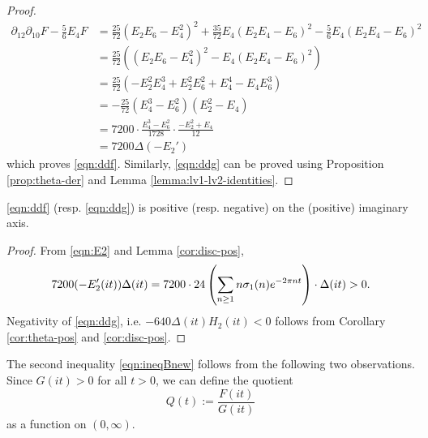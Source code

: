 \begin{proof}
\begin{align}
    \partial_{12}\partial_{10}F - \frac{5}{6} E_4 F &= \frac{25}{72}(E_2 E_6 - E_4^2)^2 + \frac{35}{72} E_4 (E_2 E_4 - E_6)^2 - \frac{5}{6} E_4 (E_2 E_4 - E_6)^2 \\
    &= \frac{25}{72} ((E_2 E_6 - E_4^2)^2 - E_4 (E_2 E_4 - E_6)^2) \\
    &= \frac{25}{72} (- E_2^2 E_4^3 + E_2^2 E_6^2 + E_4^4 - E_4 E_6^3) \\
    &= -\frac{25}{72} (E_4^3 - E_6^2) (E_2^2 - E_4) \\
    &= 7200 \cdot \frac{E_4^3 - E_6^2}{1728} \cdot \frac{-E_2^2 + E_4}{12}\\
    &= 7200 \Delta (-E_2')
\end{align}
which proves \eqref{eqn:ddf}.
Similarly, \eqref{eqn:ddg} can be proved using Proposition \ref{prop:theta-der} and Lemma \ref{lemma:lv1-lv2-identities}.
\end{proof}

\begin{corollary}\label{cor:F-G-de}
\eqref{eqn:ddf} (resp. \eqref{eqn:ddg}) is positive (resp. negative) on the (positive) imaginary axis.
\end{corollary}
\begin{proof}
From \eqref{eqn:E2} and Lemma \ref{cor:disc-pos},
\begin{equation}
    7200 (-E_2'(it)) \Delta(it) = 7200 \cdot 24 \left(\sum_{n \ge 1} n \sigma_1(n) e^{-2 \pi n t}\right) \cdot \Delta(it) > 0. \notag
\end{equation}
Negativity of \eqref{eqn:ddg}, i.e. $-640 \Delta(it) H_2(it) < 0$ follows from Corollary \ref{cor:theta-pos} and \ref{cor:disc-pos}.
\end{proof}


The second inequality \eqref{eqn:ineqBnew} follows from the following two observations.
Since $G(it) > 0$ for all $t > 0$, we can define the quotient
\begin{equation}\label{eqn:Q}
    Q(t) := \frac{F(it)}{G(it)}
\end{equation}
as a function on $(0, \infty)$.

